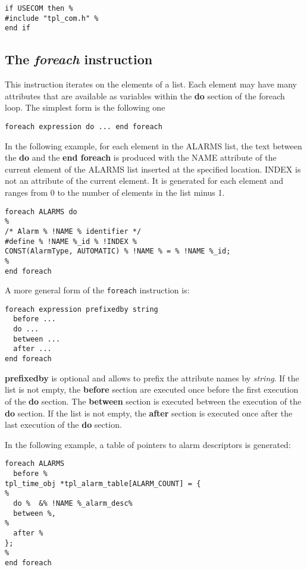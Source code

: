 \begin{lstlisting}[frame=single]
if USECOM then %
#include "tpl_com.h" %
end if
\end{lstlisting}

\subsection{The {\em foreach} instruction}

This instruction iterates on the elements of a list. Each element may have many attributes that are available as variables within the {\bf do} section of the foreach loop. The simplest form is the following one

\begin{lstlisting}[frame=single]
foreach expression do ... end foreach
\end{lstlisting}

In the following example, for each element in the ALARMS list, the text between the {\bf do} and the {\bf end foreach} is produced with the NAME attribute of the current element of the ALARMS list inserted at the specified location. INDEX is not an attribute of the current element. It is generated for each element and ranges from 0 to the number of elements in the list minus 1.
\begin{lstlisting}[frame=single]
foreach ALARMS do
%
/* Alarm % !NAME % identifier */
#define % !NAME %_id % !INDEX %
CONST(AlarmType, AUTOMATIC) % !NAME % = % !NAME %_id;
%
end foreach
\end{lstlisting}

A more general form of the {\tt foreach} instruction is:

\begin{lstlisting}[frame=single]
foreach expression prefixedby string
  before ...
  do ...
  between ...
  after ...
end foreach
\end{lstlisting}

{\bf prefixedby} is optional and allows to prefix the attribute names by {\em string}. If the list is not empty, the {\bf before} section are executed once before the first execution of the {\bf do} section. The {\bf between} section is executed between the execution of the {\bf do} section.  If the list is not empty, the {\bf after} section is executed once after the last execution of the {\bf do} section.

In the following example, a table of pointers to alarm descriptors is generated:

\begin{lstlisting}[frame=single]
foreach ALARMS
  before %
tpl_time_obj *tpl_alarm_table[ALARM_COUNT] = {
%
  do %  &% !NAME %_alarm_desc%
  between %,
%
  after %
};
%
end foreach
\end{lstlisting}


